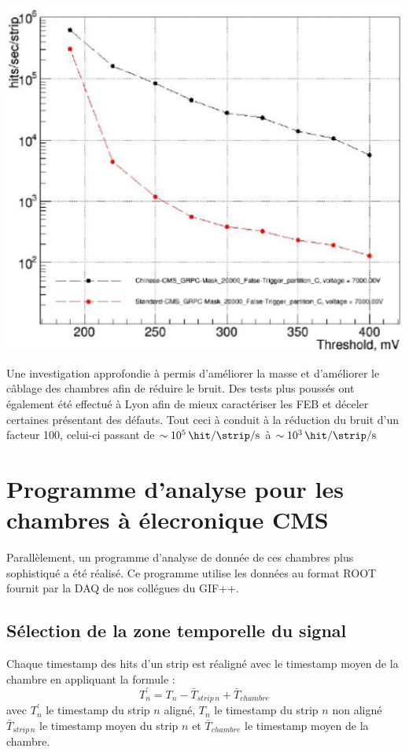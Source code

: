 \begin{minipage}[th!]{.48\textwidth}
	\noindent
	\centering
	\includegraphics[width=1\textwidth]{GLA/THNOISEH2.png}
	\label{THNOISEH2}
\end{minipage}

Une investigation approfondie à permis d'améliorer la masse et d'améliorer le câblage des chambres afin de réduire le bruit. Des tests plus poussés ont également été effectué à Lyon afin de mieux caractériser les FEB et déceler certaines présentant des défauts. Tout ceci à conduit à la réduction du bruit d'un facteur \num{100}, celui-ci passant de $\sim\SI{e5}{\hit\per\strip\per\second}$ à $\sim\SI{e3}{\hit\per\strip\per\second}$

\section{Programme d’analyse pour les chambres à élecronique CMS}
Parallèlement, un programme d'analyse de donnée de ces chambres plus sophistiqué a été réalisé. Ce programme utilise les données au format ROOT fournit par la DAQ de nos collégues du GIF++.

\subsection{Sélection de la zone temporelle du signal}
Chaque timestamp des hits d'un strip est réaligné avec le timestamp moyen de la chambre en appliquant la formule :
\begin{equation}
T^{'}_{n}=T_{n}-\bar{T}_{strip\, n}+\bar{T}_{chambre}
\end{equation}
avec $T^{'}_{n}$ le timestamp du strip $n$ aligné, $T_{n}$ le timestamp du strip $n$ non aligné $\bar{T}_{strip\, n}$ le timestamp moyen du strip $n$ et $\bar{T}_{chambre}$ le timestamp moyen de la chambre.

